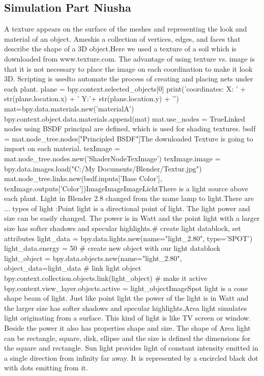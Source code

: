 \graphicspath{{members/nh/figures/}}

\subsection{Simulation Part Niusha}


A texture appears on the surface of the meshes and representing the look and material of an object. Ameshis a collection of vertices, edges, and faces that describe the shape of a 3D object.Here we used a texture of a soil which is downloaded from www.texture.com. The advantage of using texture vs. image is that it is not necessary to place the image on each coordination to make it look 3D. Scripting is usedto automate the process of creating and placing nets under each plant. plane = bpy.context.selected_objects[0] print('\nPlane coordinates: X: ' + str(plane.location.x) + ' Y:'+ str(plane.location.y) + '\n') mat=bpy.data.materials.new('materialA') bpy.context.object.data.materials.append(mat) mat.use_nodes = TrueLinked nodes using BSDF principal are defined, which is used for shading textures. bsdf = mat.node_tree.nodes["Principled BSDF"]The downloaded Texture is going to import on each material. texImage = mat.node_tree.nodes.new('ShaderNodeTexImage') texImage.image = bpy.data.images.load("C:/My Documents/Blender/Textur.jpg") mat.node_tree.links.new(bsdf.inputs['Base Color'], texImage.outputs['Color'])ImageImageImageLichtThere is a light source above each plant. Light in Blender 2.8 changed from the name lamp to light.There are ... types of light :Point light is a directional point of light. The light power and size can be easily changed. The power is in Watt and the point light with a larger size has softer shadows and specular highlights.# create light datablock, set attributes light_data = bpy.data.lights.new(name="light_2.80", type='SPOT') light_data.energy = 50 # create new object with our light datablock
 light_object = bpy.data.objects.new(name="light_2.80", object_data=light_data # link light object bpy.context.collection.objects.link(light_object) # make it active  bpy.context.view_layer.objects.active = light_objectImageSpot light is a cone shape beam of light. Just like point light the power of the light is in Watt and the larger size has softer shadows and specular highlights.Area light simulates light originating from a surface. This kind of light is like TV screen or window. Beside the power it also has properties shape and size. The shape of Area light can be rectangle, square, disk, ellipse and the size is defined the dimensions for the square and rectangle.
Sun light provides light of constant intensity emitted in a single direction from infinity far away. It is represented by a encircled black dot with dots emitting from it.
